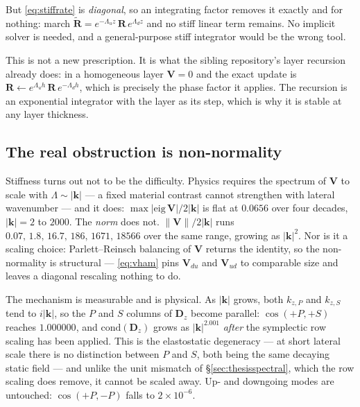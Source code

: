 \documentclass[11pt,a4paper]{article}
\newcommand{\bV}{\mathbf{V}}
\newcommand{\bR}{\mathbf{R}}
\begin{document}
But \eqref{eq:stiffrate} is \emph{diagonal}, so an integrating factor removes it
exactly and for nothing: march
$\tilde{\bR} = e^{-\Lambda_u z}\,\bR\,e^{\Lambda_d z}$ and no stiff linear term
remains.  No implicit solver is needed, and a general-purpose stiff integrator
would be the wrong tool.

This is not a new prescription.  It is what the sibling repository's layer
recursion already does: in a homogeneous layer $\bV = 0$ and the exact update is
$\bR \leftarrow e^{\Lambda_u h}\,\bR\,e^{-\Lambda_d h}$, which is precisely the
phase factor it applies.  The recursion is an exponential integrator with the
layer as its step, which is why it is stable at any layer thickness.

\subsection{The real obstruction is non-normality}\label{sec:nonnormal}

Stiffness turns out not to be the difficulty.  Physics requires the spectrum of
$\bV$ to scale with $\Lambda\sim|\mathbf{k}|$ --- a fixed material contrast
cannot strengthen with lateral wavenumber --- and it does:
$\max|\mathrm{eig}\,\bV|/2|\mathbf{k}|$ is flat at $0.0656$ over four decades,
$|\mathbf{k}| = 2$ to $2000$.  The \emph{norm} does not.
$\|\bV\|/2|\mathbf{k}|$ runs $0.07,\,1.8,\,16.7,\,186,\,1671,\,18566$ over the
same range, growing as $|\mathbf{k}|^2$.  Nor is it a scaling choice:
Parlett--Reinsch balancing of $\bV$ returns the identity, so the non-normality
is structural --- \eqref{eq:vham} pins $\bV_{du}$ and $\bV_{ud}$ to comparable
size and leaves a diagonal rescaling nothing to do.

The mechanism is measurable and is physical.  As $|\mathbf{k}|$ grows, both
$k_{z,P}$ and $k_{z,S}$ tend to $i|\mathbf{k}|$, so the $P$ and $S$ columns of
$\mathbf{D}_z$ become parallel: $\cos(+P,+S)$ reaches $1.000000$, and
$\mathrm{cond}(\mathbf{D}_z)$ grows as $|\mathbf{k}|^{2.001}$ \emph{after} the
symplectic row scaling has been applied.  This is the elastostatic degeneracy
--- at short lateral scale there is no distinction between $P$ and $S$, both
being the same decaying static field --- and unlike the unit mismatch of
\S\ref{sec:thesisspectral}, which the row scaling does remove, it cannot be
scaled away.  Up- and downgoing modes are untouched: $\cos(+P,-P)$ falls to
$2\times10^{-6}$.
\end{document}
